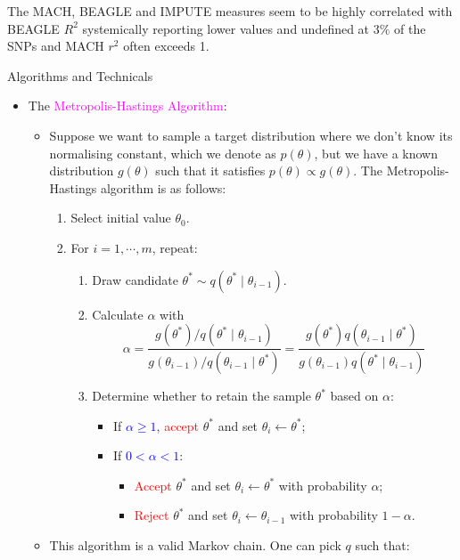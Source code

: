 \documentclass[UTF8]{book}
\newcommand{\f}{^2}
\newcommand{\concept}[1]{\textcolor{magenta}{#1}}
\newcommand{\highlight}[1]{\textcolor{red}{#1}}
\renewcommand{\emph}[1]{\textcolor{blue}{#1}}
\begin{document}
The MACH, BEAGLE and IMPUTE measures seem to be highly correlated with BEAGLE $R\f$ systemically reporting lower values and undefined at $3\%$ of the SNPs and MACH $r\f$ often exceeds 1. 
\newpage
\begin{center}
\Large{Algorithms and Technicals}
\end{center}
\begin{itemize}
\item The \concept{Metropolis-Hastings Algorithm}:
\begin{itemize}
	\item Suppose we want to sample a target distribution where we don't know its normalising constant, which we denote as $p(\theta)$, but we have a known distribution $g(\theta)$ such that it satisfies $p(\theta)\propto g(\theta)$. The Metropolis-Hastings algorithm is as follows:
\begin{enumerate}
	\item Select initial value $\theta_0$.
	\item For $i=1,\cdots,m$, repeat:
	\begin{enumerate}
		\item Draw candidate $\theta^*\sim q(\theta^*\mid\theta_{i-1})$.
		\item Calculate $\alpha$ with
		$$
			\alpha = \dfrac{g(\theta^*)/q(\theta^*\mid\theta_{i-1})}{g(\theta_{i-1})/q(\theta_{i-1}\mid\theta^*)} = \dfrac{g(\theta^*)q(\theta_{i-1}\mid \theta^*)}{g(\theta_{i-1})q(\theta^*\mid\theta_{i-1})}
		$$
		\item Determine whether to retain the sample $\theta^*$ based on $\alpha$:
		\begin{itemize}
			\item If \emph{$\alpha\geq 1$}, \highlight{accept} $\theta^*$ and set $\theta_i\leftarrow\theta^*$;
			\item If \emph{$0<\alpha<1$}:
			\begin{itemize}
				\item \highlight{Accept} $\theta^*$ and set $\theta_i\leftarrow\theta^*$ with probability $\alpha$;
				\item \highlight{Reject} $\theta^*$ and set $\theta_i\leftarrow\theta_{i-1}$ with probability $1-\alpha$.
			\end{itemize}
		\end{itemize}
\end{enumerate}		
\end{enumerate}
	\item This algorithm is a valid Markov chain. One can pick $q$ such that:

\end{itemize}
\end{itemize}
\end{document}
